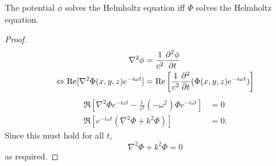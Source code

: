 \begin{propn} The potential $\phi$ solves the Helmholtz equation iff $\Phi$ solves the Helmholtz equation.
\end{propn}
\begin{proof}
\begin{align*}
  \nabla^2 \phi &= \frac{1}{c^2} \frac{\partial ^2 \phi}{\partial t} \\
  \Leftrightarrow \text{Re}[ \nabla^2 \Phi(x,y,z)e^{-i\omega t} ]
  &= \text{Re} \left[ \frac{1}{c^2} \frac{\partial ^2 }{\partial t} (\Phi(x,y,z)e^{-i\omega t}) \right]
\end{align*}
\begin{align*}
  \Re \left[
  \nabla^2 \Phi e^{-i\omega t}
  - \frac{1}{c^2}(-\omega^2) \Phi e^{-i\omega t}
  \right] &= 0 \\
  \Re \left[
  e^{-i\omega t} (\nabla^2\Phi + k^2\Phi)
  \right] &= 0.
\end{align*}
Since this must hold for all $t$,
\begin{equation*}
  \nabla^2 \Phi +k^2 \Phi = 0
\end{equation*}
as required.
\end{proof}

